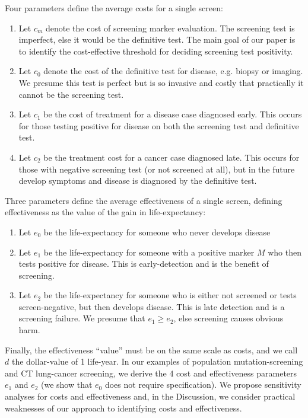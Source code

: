 \documentclass[11pt, letterpaper]{article}
\begin{document}
\noindent Four parameters define the average costs for a single screen:
\begin{enumerate}
	\item Let $c_m$ denote the cost of screening marker evaluation.
  The screening test is imperfect, else it would be the definitive test.  The main goal of our paper is to identify the cost-effective threshold for deciding screening test positivity.
	
	\item Let $c_0$ denote the cost of the definitive test for disease, e.g. biopsy or imaging.  We presume this test is perfect but is so invasive and costly that practically it cannot be the screening test.

	\item Let $c_1$ be the cost of treatment for a disease case diagnosed early.  This occurs for those testing positive for disease on both the screening test and definitive test.

	\item Let $c_2$ be the treatment cost for a cancer case diagnosed late.  This occurs for those with negative screening test (or not screened at all), but in the future develop symptoms and disease is diagnosed by the definitive test.
\end{enumerate}

\noindent Three parameters  define the average effectiveness of a single screen, defining effectiveness as the value of the gain in life-expectancy:
\begin{enumerate}
	\item Let $e_0$ be the life-expectancy for someone who never develops disease 
	
	\item Let $e_1$ be the life-expectancy for someone with a positive marker $M$ who then tests positive for disease.  This is early-detection and is the benefit of screening.
	
	\item Let $e_2$ be the life-expectancy for someone who is either not screened or tests screen-negative, but then develops disease.  This is late detection and is a screening failure.  We presume that $e_1 \ge e_2$, else screening causes obvious harm. 
\end{enumerate}
Finally, the effectiveness “value” must be on the same scale as costs, and we call $d$ the dollar-value of 1 life-year.  In our examples of population mutation-screening and CT lung-cancer screening, we derive the 4 cost and effectiveness parameters $e_1$ and $e_2$ (we show that $e_0$ does not require specification).  We propose sensitivity analyses for costs and effectiveness and, in the Discussion, we consider practical weaknesses of our approach to identifying costs and effectiveness.
\end{document}
